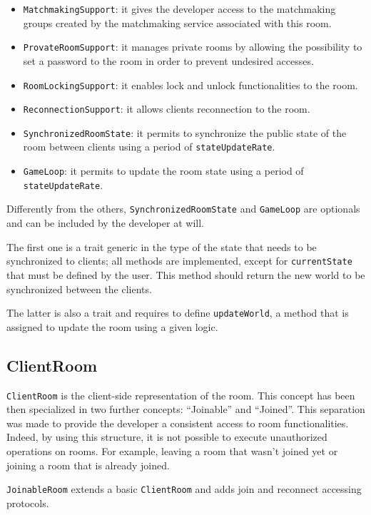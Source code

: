 \begin{itemize}
	\item \texttt{MatchmakingSupport}: it gives the developer access to the matchmaking groups created by the matchmaking service associated with this room.
	\item \texttt{ProvateRoomSupport}: it manages private rooms by allowing the possibility to set a password to the room in order to prevent undesired accesses.
	\item \texttt{RoomLockingSupport}: it enables lock and unlock functionalities to the room. 
	\item \texttt{ReconnectionSupport}: it allows clients reconnection to the room.
	\item \texttt{SynchronizedRoomState}: it permits to synchronize the public state of the room between clients using a period of \texttt{stateUpdateRate}.
	\item \texttt{GameLoop}: it permits to update the room state using a period of \texttt{stateUpdateRate}.
\end{itemize}

Differently from the others, \texttt{SynchronizedRoomState} and \texttt{GameLoop} are optionals and can be included by the developer at will.

The first one is a trait generic in the type of the state that needs to be synchronized to clients; all methods are implemented, except for \texttt{currentState} that must be defined by the user. This method should return the new world to be synchronized between the clients.

The latter is also a trait and requires to define \texttt{updateWorld}, a method that is assigned to update the room using a given logic.

\subsection{ClientRoom}

\texttt{ClientRoom} is the client-side representation of the room.
This concept has been then specialized in two further concepts: ``Joinable'' and ``Joined''.
This separation was made to provide the developer a consistent access to room functionalities. Indeed, by using this structure, it is not possible to execute unauthorized operations on rooms. For example, leaving a room that wasn't joined yet or joining a room that is already joined.

\bigskip
\texttt{JoinableRoom} extends a basic \texttt{ClientRoom} and adds join and reconnect accessing protocols.


